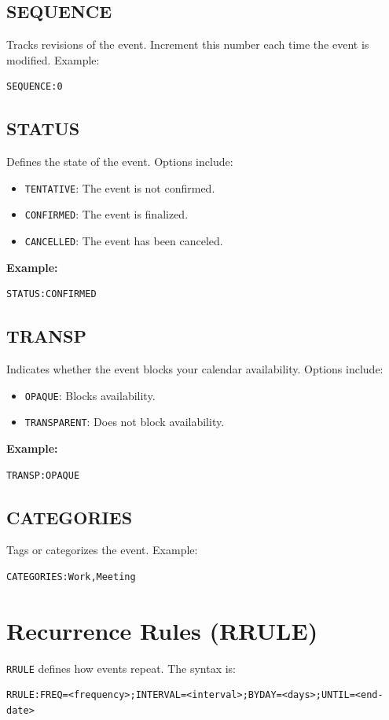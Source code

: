 \documentclass[a4paper,12pt]{article}
\begin{document}
\subsection{SEQUENCE}
Tracks revisions of the event. Increment this number each time the event is modified. Example:
\begin{verbatim}
SEQUENCE:0
\end{verbatim}

\subsection{STATUS}
Defines the state of the event. Options include:
\begin{itemize}
    \item \texttt{TENTATIVE}: The event is not confirmed.
    \item \texttt{CONFIRMED}: The event is finalized.
    \item \texttt{CANCELLED}: The event has been canceled.
\end{itemize}
\textbf{Example:}
\begin{verbatim}
STATUS:CONFIRMED
\end{verbatim}

\subsection{TRANSP}
Indicates whether the event blocks your calendar availability. Options include:
\begin{itemize}
    \item \texttt{OPAQUE}: Blocks availability.
    \item \texttt{TRANSPARENT}: Does not block availability.
\end{itemize}
\textbf{Example:}
\begin{verbatim}
TRANSP:OPAQUE
\end{verbatim}

\subsection{CATEGORIES}
Tags or categorizes the event. Example:
\begin{verbatim}
CATEGORIES:Work,Meeting
\end{verbatim}

\section{Recurrence Rules (RRULE)}
\texttt{RRULE} defines how events repeat. The syntax is:
\begin{verbatim}
RRULE:FREQ=<frequency>;INTERVAL=<interval>;BYDAY=<days>;UNTIL=<end-date>
\end{verbatim}
\end{document}
